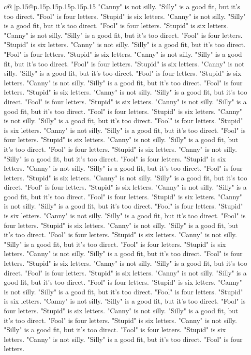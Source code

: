 \documentclass{article}
\begin{document}
{\begin{supertabular}{c@{$\;$}|p{.15\linewidth}@{}p{.15\linewidth}p{.15\linewidth}p{.15\linewidth}p{.15\linewidth}p{.15\linewidth}}
{{{"Canny" is not silly. "Silly" is a good fit, but it's too direct. "Fool" is four letters. "Stupid" is six letters. "Canny" is not silly. "Silly" is a good fit, but it's too direct. "Fool" is four letters. "Stupid" is six letters. "Canny" is not silly. "Silly" is a good fit, but it's too direct. "Fool" is four letters. "Stupid" is six letters. "Canny" is not silly. "Silly" is a good fit, but it's too direct. "Fool" is four letters. "Stupid" is six letters. "Canny" is not silly. "Silly" is a good fit, but it's too direct. "Fool" is four letters. "Stupid" is six letters. "Canny" is not silly. "Silly" is a good fit, but it's too direct. "Fool" is four letters. "Stupid" is six letters. "Canny" is not silly. "Silly" is a good fit, but it's too direct. "Fool" is four letters. "Stupid" is six letters. "Canny" is not silly. "Silly" is a good fit, but it's too direct. "Fool" is four letters. "Stupid" is six letters. "Canny" is not silly. "Silly" is a good fit, but it's too direct. "Fool" is four letters. "Stupid" is six letters. "Canny" is not silly. "Silly" is a good fit, but it's too direct. "Fool" is four letters. "Stupid" is six letters. "Canny" is not silly. "Silly" is a good fit, but it's too direct. "Fool" is four letters. "Stupid" is six letters. "Canny" is not silly. "Silly" is a good fit, but it's too direct. "Fool" is four letters. "Stupid" is six letters. "Canny" is not silly. "Silly" is a good fit, but it's too direct. "Fool" is four letters. "Stupid" is six letters. "Canny" is not silly. "Silly" is a good fit, but it's too direct. "Fool" is four letters. "Stupid" is six letters. "Canny" is not silly. "Silly" is a good fit, but it's too direct. "Fool" is four letters. "Stupid" is six letters. "Canny" is not silly. "Silly" is a good fit, but it's too direct. "Fool" is four letters. "Stupid" is six letters. "Canny" is not silly. "Silly" is a good fit, but it's too direct. "Fool" is four letters. "Stupid" is six letters. "Canny" is not silly. "Silly" is a good fit, but it's too direct. "Fool" is four letters. "Stupid" is six letters. "Canny" is not silly. "Silly" is a good fit, but it's too direct. "Fool" is four letters. "Stupid" is six letters. "Canny" is not silly. "Silly" is a good fit, but it's too direct. "Fool" is four letters. "Stupid" is six letters. "Canny" is not silly. "Silly" is a good fit, but it's too direct. "Fool" is four letters. "Stupid" is six letters. "Canny" is not silly. "Silly" is a good fit, but it's too direct. "Fool" is four letters. "Stupid" is six letters. "Canny" is not silly. "Silly" is a good fit, but it's too direct. "Fool" is four letters. "Stupid" is six letters. "Canny" is not silly. "Silly" is a good fit, but it's too direct. "Fool" is four letters. "Stupid" is six letters. "Canny" is not silly. "Silly" is a good fit, but it's too direct. "Fool" is four letters. "Stupid" is six letters. "Canny" is not silly. "Silly" is a good fit, but it's too direct. "Fool" is four letters. "Stupid" is six letters. "Canny" is not silly. "Silly" is a good fit, but it's too direct. "Fool" is four letters. "Stupid" is six letters. "Canny" is not silly. "Silly" is a good fit, but it's too direct. "Fool" is four letters. }}}
\end{supertabular}}
\end{document}
